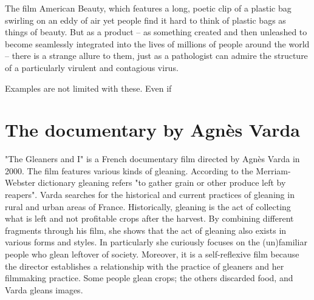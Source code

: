 

The film American Beauty, which features a long, poetic clip of a plastic bag swirling on an eddy of air yet people find it hard to think of plastic bags as things of beauty. But as a product -- as something created and then unleashed to become seamlessly integrated into the lives of millions of people around the world -- there is a strange allure to them, just as a pathologist can admire the structure of a particularly virulent and contagious virus.

Examples are not limited with these. Even if 




%
%
\section{The documentary  by Agnès Varda}
"The Gleaners and I" is a French documentary film directed by Agnès Varda in 2000. The film features various kinds of gleaning. According to the Merriam-Webster dictionary gleaning refers "to gather grain or other produce left by reapers". Varda searches for the historical and current practices of gleaning in rural and urban areas of France. Historically, gleaning is the act of collecting what is left and not profitable crops after the harvest. By combining different fragments through his film, she shows that the act of gleaning also exists in various forms and styles. In particularly she curiously focuses on the (un)familiar people who glean leftover of society. Moreover, it is a self-reflexive film because the director establishes a relationship with the practice of gleaners and her filmmaking practice. Some people glean crops; the others discarded food, and Varda gleans images.

